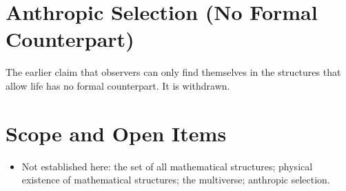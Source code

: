 \documentclass[11pt, a4paper]{article}
\begin{document}
\section{Anthropic Selection (No Formal Counterpart)}
The earlier claim that observers can only find themselves in the structures that allow life has no formal counterpart. It is withdrawn.

\section{Scope and Open Items}
\begin{itemize}
  \item Not established here: the set of all mathematical structures; physical existence of mathematical structures; the multiverse; anthropic selection.
\end{itemize}
\end{document}
